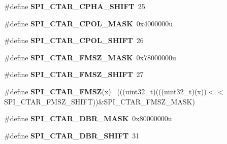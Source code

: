 \begin{DoxyCompactItemize}
\item 
\hypertarget{group___s_p_i___register___masks_ga1a27d47d54bd5b51d69b21216b3662b4}{}\#define {\bfseries S\+P\+I\+\_\+\+C\+T\+A\+R\+\_\+\+C\+P\+H\+A\+\_\+\+S\+H\+I\+F\+T}~25\label{group___s_p_i___register___masks_ga1a27d47d54bd5b51d69b21216b3662b4}

\item 
\hypertarget{group___s_p_i___register___masks_ga128560de0ef72566ec53bb208e6ad5ef}{}\#define {\bfseries S\+P\+I\+\_\+\+C\+T\+A\+R\+\_\+\+C\+P\+O\+L\+\_\+\+M\+A\+S\+K}~0x4000000u\label{group___s_p_i___register___masks_ga128560de0ef72566ec53bb208e6ad5ef}

\item 
\hypertarget{group___s_p_i___register___masks_gac46d6c45f2f45383d1f6d062a570e81d}{}\#define {\bfseries S\+P\+I\+\_\+\+C\+T\+A\+R\+\_\+\+C\+P\+O\+L\+\_\+\+S\+H\+I\+F\+T}~26\label{group___s_p_i___register___masks_gac46d6c45f2f45383d1f6d062a570e81d}

\item 
\hypertarget{group___s_p_i___register___masks_ga71b046a902929cf107f46e422092ff33}{}\#define {\bfseries S\+P\+I\+\_\+\+C\+T\+A\+R\+\_\+\+F\+M\+S\+Z\+\_\+\+M\+A\+S\+K}~0x78000000u\label{group___s_p_i___register___masks_ga71b046a902929cf107f46e422092ff33}

\item 
\hypertarget{group___s_p_i___register___masks_gaabebaa480c90d32ad8bc580ea2507b8e}{}\#define {\bfseries S\+P\+I\+\_\+\+C\+T\+A\+R\+\_\+\+F\+M\+S\+Z\+\_\+\+S\+H\+I\+F\+T}~27\label{group___s_p_i___register___masks_gaabebaa480c90d32ad8bc580ea2507b8e}

\item 
\hypertarget{group___s_p_i___register___masks_gac2c43b9a91cd1755fb12864271b570f7}{}\#define {\bfseries S\+P\+I\+\_\+\+C\+T\+A\+R\+\_\+\+F\+M\+S\+Z}(x)                                              ~(((uint32\+\_\+t)(((uint32\+\_\+t)(x))$<$$<$S\+P\+I\+\_\+\+C\+T\+A\+R\+\_\+\+F\+M\+S\+Z\+\_\+\+S\+H\+I\+F\+T))\&S\+P\+I\+\_\+\+C\+T\+A\+R\+\_\+\+F\+M\+S\+Z\+\_\+\+M\+A\+S\+K)\label{group___s_p_i___register___masks_gac2c43b9a91cd1755fb12864271b570f7}

\item 
\hypertarget{group___s_p_i___register___masks_ga3347aad10c0b5dc1a5062275e89353b2}{}\#define {\bfseries S\+P\+I\+\_\+\+C\+T\+A\+R\+\_\+\+D\+B\+R\+\_\+\+M\+A\+S\+K}~0x80000000u\label{group___s_p_i___register___masks_ga3347aad10c0b5dc1a5062275e89353b2}

\item 
\hypertarget{group___s_p_i___register___masks_ga4600954a3cc5c07f14c1b0e602cec4cd}{}\#define {\bfseries S\+P\+I\+\_\+\+C\+T\+A\+R\+\_\+\+D\+B\+R\+\_\+\+S\+H\+I\+F\+T}~31\label{group___s_p_i___register___masks_ga4600954a3cc5c07f14c1b0e602cec4cd}


\end{DoxyCompactItemize}
